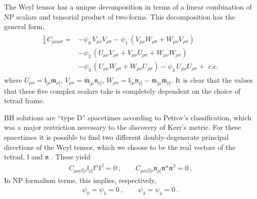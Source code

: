 The Weyl tensor has a unique decomposition in terms of a linear combination of NP scalars and tensorial product of two-forms.
This decomposition has the general form,
\begin{align}
    \begin{split}
    \frac{1}{4} \, C_{\mu\nu\rho\sigma} = & - \psi_0 \,V_{\mu\nu} V_{\rho\sigma} - \psi_1 \, (V_{\mu\nu} W_{\rho\sigma} + W_{\mu\nu} V_{\rho\sigma}) \\
    & - \psi_2 \, (U_{\mu\nu}V_{\rho\sigma} + V_{\mu\nu}U_{\rho\sigma} + W_{\mu\nu}W_{\rho\sigma}) \\
    & - \psi_3 \, (U_{\mu\nu}W_{\rho\sigma} + W_{\mu\nu}U_{\rho\sigma})
    - \psi_4 \, U_{\mu\nu}U_{\rho\sigma} + \text{ c.c.}
    \end{split}
\end{align}
where $U_{\mu\nu} = \mathfrak{l}_{[\mu} \mathfrak{m}_{\nu]}$, $V_{\mu\nu} = \bar{\mathfrak{m}}_{[\mu} \mathfrak{n}_{\nu]}$, $W_{\mu\nu} = \mathfrak{l}_{[\mu} \mathfrak{n}_{\nu]} - \mathfrak{m}_{[\mu} \bar{\mathfrak{m}}_{\nu]}$.
It is clear that the values that these five complex scalars take is completely dependent on the choice of tetrad frame. 

BH solutions are ``type D'' spacetimes according to Petrov's classification, which was a major restriction necessary to the discovery of Kerr's metric.
For these spacetimes it is possible to find two different doubly-degenerate principal directions of the Weyl tensor, which we choose to be the real vectors of the tetrad, $\bm{\mathfrak{l}}$ and $\bm{\mathfrak{n}}$ \cite{Chandrasekhar1998}.
These yield
\begin{align}
    C_{\mu\alpha\beta[\nu} \mathfrak{l}_{\rho]} \mathfrak{l}^\alpha \mathfrak{l}^\beta = 0 ~, \qquad C_{\mu\alpha\beta[\nu} \mathfrak{n}_{\rho]} \mathfrak{n}^\alpha \mathfrak{n}^\beta = 0  ~.
\end{align}
In NP formalism terms, this implies, respectively,
\begin{align}
    \psi_0=\psi_1=0 ~,\qquad \psi_3=\psi_4=0 ~.
\end{align}


